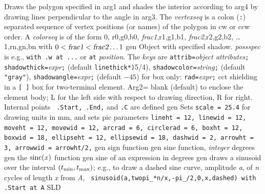   {Draws the polygon specified in arg1 and
  shades the interior according
   to arg4 by drawing lines perpendicular to the angle in arg3.  The {\sl
   vertexseq} is a colon ({\tt:}) separated sequence of vertex positions
   (or names) of the polygon in cw or ccw order. A {\sl colorseq} is of
   the form 0, r0,g0,b0, {\sl frac1},r1,g1,b1, {\sl frac2},r2,g2,b2,
   \ldots 1,rn,gn,bn with $0 < \hbox{\sl frac1} < \hbox{\sl frac2}
   \ldots 1$ }
  {gen}
  { Object with specified shadow.  {\sl possspec} is e.g.,
    {\tt with .w at ...} or {\tt at} {\sl position}.
    The {\sl keys} are
       {\tt attrib=}{\sl object attributes}{\tt ;}
       {\tt shadowthick=}{\sl expr}{\tt ;} (default {\tt linethick*)}5/4),
       {\tt shadowcolor=}{\sl string}{\tt ;} (default {\tt "gray"}),
       {\tt shadowangle=}{\sl expr}{\tt ;} (default $-45$)
       for box only: {\tt rad=}{\sl expr}{\tt ;}
 }
 {cct}
  {shielding in a {\tt [ ]} box for
  two-terminal element. Arg2= blank
    (default) to enclose the element body; L for the left side with
    respect to drawing direction, R for right. Internal points {\tt
    .Start, .End,} and {\tt .C} are defined}
  {gen}
  {Sets {\tt scale = 25.4} for drawing units in mm, and sets
   pic parameters {\tt lineht = 12, linewid = 12, moveht = 12,
    movewid = 12,
    arcrad = 6, circlerad = 6, boxht = 12, boxwid = 18, ellipseht = 12,
    ellipsewid = 18, dashwid = 2, arrowht = 3, arrowwid = arrowht/2,}}
  {gen}
  {sign function}
  {gen}
  {sine function, {\sl integer\/} degrees}
  {gen}
  {the $\hbox{sinc}(x)$ function}
  {gen}
  {sine of an expression in degrees}
  {gen}
  {draws a sinusoid over the interval $(t_{\hbox{\scriptsize min}},
  t_{\hbox{\scriptsize max}})$;
   e.g., to draw a dashed sine curve, amplitude {\sl a},
   of {\sl n} cycles of length {\sl x} from {\sl A}, {\tt
   sinusoid(a,twopi\_*n/x,-pi\_/2,0,x,dashed) with .Start at A}}
  {SLD}
